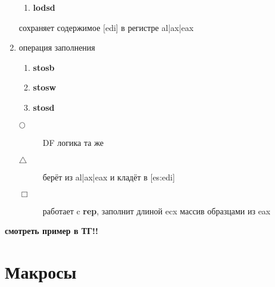 \documentclass[a4paper, 12pt]{article}
\begin{document}
\begin{enumerate}
\begin{enumerate}
            \item \textbf{lodsd}
        \end{enumerate}
        сохраняет содержимое [edi] в регистре al|ax|eax
        \item операция заполнения
        \begin{enumerate}
            \item \textbf{stosb}
            \item \textbf{stosw}
            \item \textbf{stosd}
        \end{enumerate}
        \begin{description}
            \item[$\bigcirc$] DF логика та же
            \item[$\triangle$] берёт из al|ax|eax и кладёт в [es:edi]
            \item[$\Box$] работает c \textbf{rep}, заполнит длиной ecx массив образцами из eax
        \end{description}
    \end{enumerate}
    \textbf{смотреть пример в ТГ!!}
    \newpage
    \section*{Макросы}
    \hypertarget{makros}{}

\end{document}
